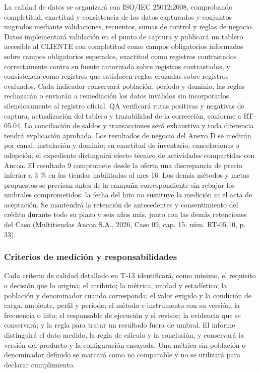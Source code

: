 \documentclass[11pt]{article}
\begin{document}
La calidad de datos se organizará con ISO/IEC 25012:2008, comprobando completitud, exactitud y consistencia de los datos capturados y conjuntos migrados mediante validaciones, recuentos, sumas de control y reglas de negocio. Datos implementará validación en el punto de captura y publicará un tablero accesible al CLIENTE con completitud como campos obligatorios informados sobre campos obligatorios esperados, exactitud como registros contrastados correctamente contra su fuente autorizada sobre registros contrastados, y consistencia como registros que satisfacen reglas cruzadas sobre registros evaluados. Cada indicador conservará población, período y dominio; las reglas rechazarán o enviarán a remediación los datos inválidos sin incorporarlos silenciosamente al registro oficial. QA verificará rutas positivas y negativas de captura, actualización del tablero y trazabilidad de la corrección, conforme a RT-05.04. La conciliación de saldos y transacciones será exhaustiva y toda diferencia tendrá explicación aprobada. Los resultados de negocio del Anexo D se medirán por canal, instalación y dominio; en exactitud de inventario, cancelaciones o adopción, el expediente distinguirá efecto técnico de actividades compartidas con Ancoa. El resultado 9 compromete desde la oferta una discrepancia de precio inferior a 3 \% en las tiendas habilitadas al mes 16. Los demás métodos y metas propuestos se precisan antes de la campaña correspondiente sin rebajar los umbrales comprometidos; la fecha del hito no sustituye la medición ni el acta de aceptación. Se mantendrá la retención de antecedentes y consentimiento del crédito durante todo su plazo y seis años más, junto con las demás retenciones del Caso (Multitiendas Ancoa S.A., 2026, Caso 09, cap. 15, núm. RT-05.10, p. 33).

\subsubsection{Criterios de medición y responsabilidades}

Cada criterio de calidad detallado en T-13 identificará, como mínimo, el requisito o decisión que lo origina; el atributo; la métrica, unidad y estadístico; la población y denominador cuando corresponda; el valor exigido y la condición de carga, ambiente, perfil y período; el método e instrumento con su versión; la frecuencia o hito; el responsable de ejecución y el revisor; la evidencia que se conservará; y la regla para tratar un resultado fuera de umbral. El informe distinguirá el dato medido, la regla de cálculo y la conclusión, y conservará la versión del producto y la configuración ensayada. Una métrica sin población o denominador definido se marcará como no comparable y no se utilizará para declarar cumplimiento.
\end{document}
